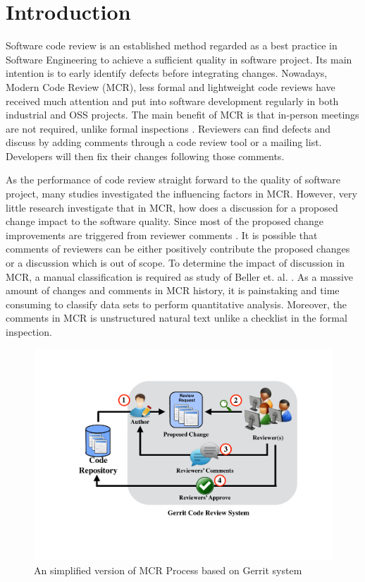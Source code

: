 \documentclass[conference]{IEEEtran}
\begin{document}
\section{Introduction}
Software code review is an established method regarded as a best practice in Software Engineering to achieve a sufficient quality in software project.
Its main intention is to early identify defects before integrating changes.
Nowadays, Modern Code Review (MCR)\cite{Bacchelli2013a}, less formal and lightweight code reviews have received much attention and put into software development regularly in both industrial and OSS projects.
The main benefit of MCR is that in-person meetings are not required, unlike formal inspections \cite{Fagan:1976:DCI:1661010.1661012}.
Reviewers can find defects and discuss by adding comments through a code review tool or a mailing list.
Developers will then fix their changes following those comments.

As the performance of code review straight forward to the quality of software project, many studies investigated the influencing factors in MCR\cite{Baysal2001,Mcintosh,Beller,Hamasaki2013}. However, very little research investigate that in MCR, how does a discussion for a proposed change impact to the software quality. Since most of the proposed change improvements are triggered from reviewer comments \cite{Beller}. 
It is possible that comments of reviewers can be either positively contribute the proposed changes or a discussion which is out of scope.
To determine the impact of discussion in MCR, a manual classification is required as study of Beller et. al. \cite{Beller}. As a massive amount of changes and comments in MCR history\cite{Balachandran2013,Thongtanunam2014}, it is painstaking and time consuming to classify data sets to perform quantitative analysis. Moreover, the comments in MCR is unstructured natural text unlike a checklist in the formal inspection. 
\begin{figure}[!t]
\centering
\includegraphics[scale=0.35, trim= 100 110 50 80, clip=true]{review_process}
\caption{An simplified version of MCR Process based on Gerrit system}
\label{fig:process}
\end{figure}
\end{document}
